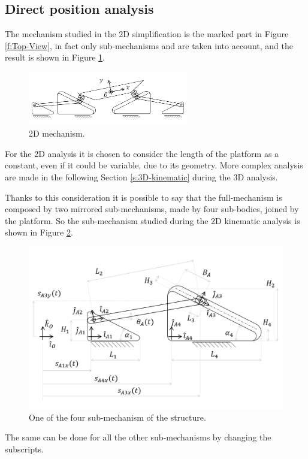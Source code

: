 \documentclass[10.5pt, twocolumn]{article}
\newcommand*\circled[1]{\tikz[baseline=(char.base)]{
	\node[shape=circle,draw,inner sep=2pt] (char) {#1};}}
\begin{document}
\subsection{Direct position analysis}
\label{s:Direct-position}
The mechanism studied in the 2D simplification is the marked part in Figure \ref{f:Top-View}, in fact only sub-mechanisms \circled{A} and \circled{B} are taken into account, and the result is shown in Figure \ref{f:2D_Mechanism}.
\begin{figure}[h!]
	\centering
	\includegraphics[width=7cm]{Images/Mechanism_LateralView}
	\caption{2D mechanism.}
	\label{f:2D_Mechanism}
\end{figure}

For the 2D analysis it is chosen to consider the length of the platform as a constant, even if it could be variable, due to its geometry.
More complex analysis are made in the following Section \ref{s:3D-kinematic} during the 3D analysis.

Thanks to this consideration it is possible to say that the full-mechanism is composed by two mirrored sub-mechanisms, made by four sub-bodies, joined by the platform.
So the sub-mechanism studied during the 2D kinematic analysis is shown in Figure \ref{f:Sub-Mechanism}.
\begin{figure}[h!]
	\centering
	\includegraphics[width=12cm]{Images/Sub-Mechanism}
	\caption{One of the four sub-mechanism of the structure.}
	\label{f:Sub-Mechanism}
\end{figure}
The same can be done for all the other sub-mechanisms by changing the subscripts.
\end{document}
